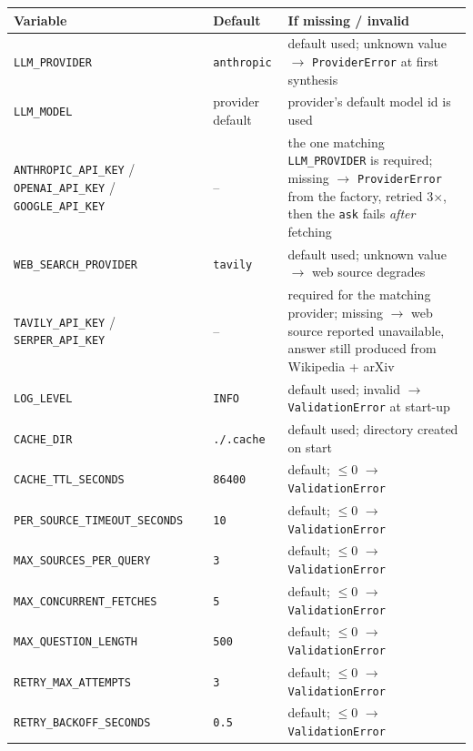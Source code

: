 \documentclass[11pt,a4paper]{article}
\begin{document}
\begin{center}\small
\begin{tabularx}{\textwidth}{@{}>{\RaggedRight\arraybackslash}p{5.3cm} >{\RaggedRight\arraybackslash}p{2.0cm} X@{}}
\toprule
\textbf{Variable} & \textbf{Default} & \textbf{If missing / invalid} \\
\midrule
\texttt{LLM\_PROVIDER} & \texttt{anthropic} & default used; unknown value $\to$ \texttt{ProviderError} at first synthesis \\
\texttt{LLM\_MODEL} & provider default & provider's default model id is used \\
\texttt{ANTHROPIC\_API\_KEY} / \texttt{OPENAI\_API\_KEY} / \texttt{GOOGLE\_API\_KEY} & -- & the one matching \texttt{LLM\_PROVIDER} is required; missing $\to$ \texttt{ProviderError} from the factory, retried 3$\times$, then the \texttt{ask} fails \emph{after} fetching \\
\texttt{WEB\_SEARCH\_PROVIDER} & \texttt{tavily} & default used; unknown value $\to$ web source degrades \\
\texttt{TAVILY\_API\_KEY} / \texttt{SERPER\_API\_KEY} & -- & required for the matching provider; missing $\to$ web source reported unavailable, answer still produced from Wikipedia + arXiv \\
\texttt{LOG\_LEVEL} & \texttt{INFO} & default used; invalid $\to$ \texttt{ValidationError} at start-up \\
\texttt{CACHE\_DIR} & \texttt{./.cache} & default used; directory created on start \\
\texttt{CACHE\_TTL\_SECONDS} & \texttt{86400} & default; $\le 0$ $\to$ \texttt{ValidationError} \\
\texttt{PER\_SOURCE\_TIMEOUT\_SECONDS} & \texttt{10} & default; $\le 0$ $\to$ \texttt{ValidationError} \\
\texttt{MAX\_SOURCES\_PER\_QUERY} & \texttt{3} & default; $\le 0$ $\to$ \texttt{ValidationError} \\
\texttt{MAX\_CONCURRENT\_FETCHES} & \texttt{5} & default; $\le 0$ $\to$ \texttt{ValidationError} \\
\texttt{MAX\_QUESTION\_LENGTH} & \texttt{500} & default; $\le 0$ $\to$ \texttt{ValidationError} \\
\texttt{RETRY\_MAX\_ATTEMPTS} & \texttt{3} & default; $\le 0$ $\to$ \texttt{ValidationError} \\
\texttt{RETRY\_BACKOFF\_SECONDS} & \texttt{0.5} & default; $\le 0$ $\to$ \texttt{ValidationError} \\
\bottomrule
\end{tabularx}
\end{center}
\end{document}
